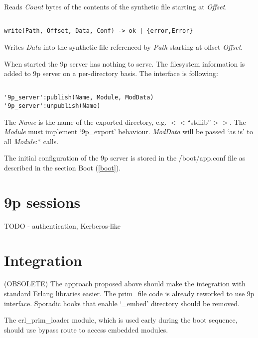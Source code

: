 Reads \emph{Count} bytes of the contents of the synthetic file starting at \emph{Offset}.

\begin{adjustwidth}{2.5em}{2.5em}
\begin{verbatim}

write(Path, Offset, Data, Conf) -> ok | {error,Error}

\end{verbatim}
\end{adjustwidth}

Writes \emph{Data} into the synthetic file referenced by \emph{Path} starting at offset
\emph{Offset}.

When started the 9p server has nothing to serve. The filesystem information is
added to 9p server on a per-directory basis. The interface is following:

\begin{adjustwidth}{2.5em}{2.5em}
\begin{verbatim}

'9p_server':publish(Name, Module, ModData)
'9p_server':unpublish(Name)

\end{verbatim}
\end{adjustwidth}

The \emph{Name} is the name of the exported directory, e.g. $<$$<$``stdlib''$>$$>$. The
\emph{Module} must implement `9p\_export' behaviour. \emph{ModData} will be passed `as is'
to all \emph{Module}:* calls.

The initial configuration of the 9p server is stored in the \slash boot\slash app.conf file
as described in the section Boot (\autoref{boot}).

\chapter{9p sessions}
\label{psessions}

TODO - authentication, Kerberos-like

\chapter{Integration}
\label{integration}

(OBSOLETE) The approach proposed above should make the integration with standard Erlang
libraries easier. The prim\_file code is already reworked to use 9p interface.
Sporadic hooks that enable `\_embed' directory should be removed.

The erl\_prim\_loader module, which is used early during the boot sequence,
should use bypass route to access embedded modules.

